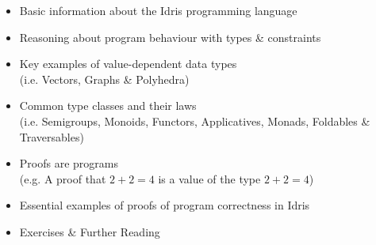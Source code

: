 \begin{itemize}
\item Basic information about the Idris programming language
\item Reasoning about program behaviour with types \& constraints
\item Key examples of value-dependent data types \\
  \small
  (i.e. Vectors, Graphs \& Polyhedra)
  \normalsize
\item Common type classes and their laws \\
  \small
  (i.e. Semigroups, Monoids, Functors, Applicatives, Monads, Foldables \& Traversables)
  \normalsize
\item Proofs are programs \\
  \small
  (e.g. A proof that $2 + 2 = 4$ is a value of the type $2 + 2 = 4$)
  \normalsize
\item Essential examples of proofs of program correctness in Idris
\item Exercises \& Further Reading
\end{itemize}
